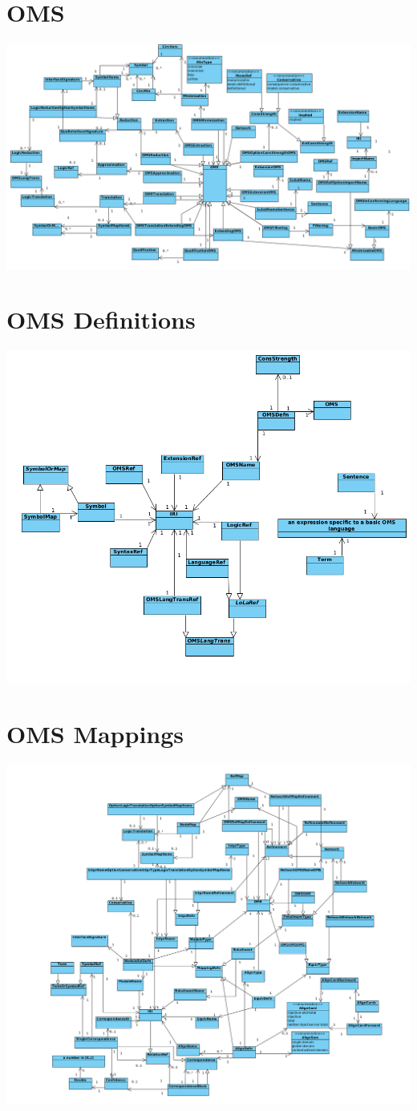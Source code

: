 \documentclass[10pt,fleqn,%
\ifpretendfinal
final%
\else
draft%
\fi,
]{scrreprt}
\newcommand{\sclause}[1]{\section{#1}}
\begin{document}
\sclause{OMS}

\toleft\includegraphics[scale=0.4]{mof/dia/dia2.png}

\sclause{OMS Definitions}

\toleft\includegraphics[scale=0.6]{mof/dia/dia3.png}

\sclause{OMS Mappings}

\toleft\includegraphics[scale=0.4]{mof/dia/dia4.png}
\end{document}
